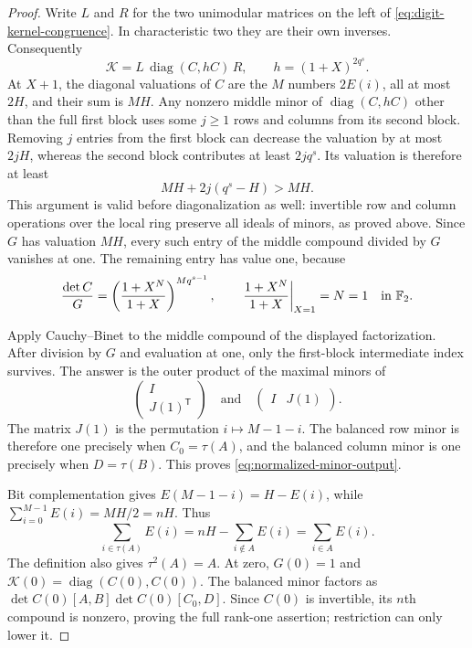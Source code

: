 \begin{proof}
Write $L$ and $R$ for the two unimodular matrices on the left
of \eqref{eq:digit-kernel-congruence}. In characteristic two they
are their own inverses. Consequently
\[
 \mathcal K=L\,\operatorname{diag}(C,hC)\,R,
 \qquad h=(1+X)^{2q^s}.
\]
At $X+1$, the diagonal valuations of $C$ are the $M$ numbers
$2E(i)$, all at most $2H$, and their sum is $MH$.
Any nonzero middle minor of $\operatorname{diag}(C,hC)$ other
than the full first block uses some $j\geq1$ rows and columns
from its second block. Removing $j$ entries from the first block
can decrease the valuation by at most $2jH$, whereas the second
block contributes at least $2jq^s$. Its valuation is therefore
at least
\[
 MH+2j(q^s-H)>MH.
\]
This argument is valid before diagonalization as well: invertible
row and column operations over the local ring preserve all ideals
of minors, as proved above. Since $G$ has valuation $MH$, every
such entry of the middle compound divided by $G$ vanishes at one.
The remaining entry has value one, because
\[
 \frac{\det C}{G}
   =\left(\frac{1+X^N}{1+X}\right)^{M q^{s-1}},
 \qquad
 \left.\frac{1+X^N}{1+X}\right|_{X=1}=N=1\quad\text{in }\mathbb F_2.
\]

Apply Cauchy--Binet to the middle compound of the displayed
factorization. After division by $G$ and evaluation at one,
only the first-block intermediate index survives. The answer
is the outer product of the maximal minors of
\[
 \begin{pmatrix}I\\J(1)^{\mathsf T}\end{pmatrix}
 \quad\text{and}\quad
 \begin{pmatrix}I&J(1)\end{pmatrix}.
\]
The matrix $J(1)$ is the permutation $i\mapsto M-1-i$.
The balanced row minor is therefore one precisely when
$C_0=\tau(A)$, and the balanced column minor is one precisely
when $D=\tau(B)$. This proves \eqref{eq:normalized-minor-output}.

Bit complementation gives $E(M-1-i)=H-E(i)$, while
$\sum_{i=0}^{M-1}E(i)=MH/2=nH$. Thus
\[
 \sum_{i\in\tau(A)}E(i)
 =nH-\sum_{i\notin A}E(i)
 =\sum_{i\in A}E(i).
\]
The definition also gives $\tau^2(A)=A$.
At zero, $G(0)=1$ and
$\mathcal K(0)=\operatorname{diag}(C(0),C(0))$.
The balanced minor factors as
$\det C(0)[A,B]\det C(0)[C_0,D]$.
Since $C(0)$ is invertible, its $n$th compound is nonzero,
proving the full rank-one assertion; restriction can only lower it.


\end{proof}
